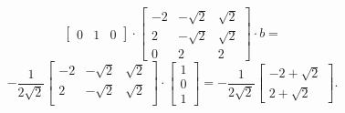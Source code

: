 \documentclass[14pt, notitlepage]{article}
\begin{document}
\begin{itemize}
\[\begin{bmatrix}
                0 & 1 & 0
            \end{bmatrix} \cdot \begin{bmatrix}
                -2 & -\sqrt{2} & \sqrt{2} \\
                2 & -\sqrt{2} & \sqrt{2} \\
                0 & 2 & 2
            \end{bmatrix} \cdot b =
        \]
        \[
            -\frac{1}{2\sqrt{2}} \begin{bmatrix}
                -2 & -\sqrt{2} & \sqrt{2} \\
                2 & -\sqrt{2} & \sqrt{2} \\
            \end{bmatrix} \cdot \begin{bmatrix}
                1 \\ 0 \\ 1
            \end{bmatrix} = -\frac{1}{2\sqrt{2}} \begin{bmatrix}
                -2 + \sqrt{2} \\ 2 + \sqrt{2}
            \end{bmatrix}.
        \]
    

\end{itemize}
\end{document}
